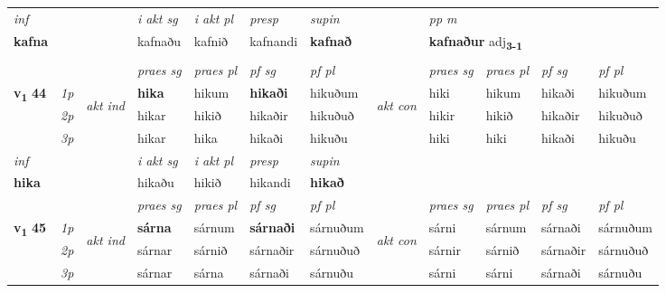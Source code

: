 \begin{longtable}[l]{X>{\footnotesize\itshape}llXXXXlXXXX}
   {\textit{inf}} & &  & \textit{i akt sg} & \textit{i akt pl}   & \textit{presp} & \textit{supin}  && \textit{pp m} \\*
  {\textbf{kafna}} & && kafnaðu  & kafnið   & kafnandi &  \textbf{kafnað}  && \multicolumn{2}{l}{\textbf{kafnaður} adj\textbf{\textsubscript{3-1}}} \\*

\midrule


& \\
\midrule

 & &   & \textit{praes sg}  & \textit{praes pl}    & \textit{ pf sg} & \textit{pf pl} & & \textit{praes sg}  & \textit{praes pl}    & \textit{pf sg} & \textit{pf pl }  \\ \cmidrule{4-7} \cmidrule{9-12}
 \multirow{2}{*}{{{\textbf{v{\textsubscript{1}}} \Large{\textbf{44}}}}}  & 1p & \multirow{3}{*}{\begin{turn}{90}\textit{akt ind}\end{turn}} & \textbf{hika} & hikum & \textbf{hikaði} & hikuðum & \multirow{3}{*}{\begin{turn}{90}\textit{akt con}\end{turn}} &hiki & hikum & hikaði & hikuðum\\*
 & 2p &  &  hikar  & hikið & hikaðir & hikuðuð & & hikir & hikið & hikaðir & hikuðuð \\*
 & 3p &  & hikar & hika & hikaði & hikuðu & & hiki & hiki& hikaði & hikuðu \\*
\cmidrule{4-7} \cmidrule{9-12}

   {\textit{inf}} & &  & \textit{i akt sg} & \textit{i akt pl}   & \textit{presp} & \textit{supin}   \\*
  {\textbf{hika}} & && hikaðu  & hikið   & hikandi &  \textbf{hikað}   \\*

\midrule

 & &   & \textit{praes sg}  & \textit{praes pl}    & \textit{ pf sg} & \textit{pf pl} & & \textit{praes sg}  & \textit{praes pl}    & \textit{pf sg} & \textit{pf pl }  \\ \cmidrule{4-7} \cmidrule{9-12}
 \multirow{2}{*}{{{\textbf{v{\textsubscript{1}}} \Large{\textbf{45}}}}}  & 1p & \multirow{3}{*}{\begin{turn}{90}\textit{akt ind}\end{turn}} & \textbf{sárna} & sárnum & \textbf{sárnaði} & sárnuðum & \multirow{3}{*}{\begin{turn}{90}\textit{akt con}\end{turn}} &sárni & sárnum & sárnaði & sárnuðum\\*
 & 2p &  &  sárnar  & sárnið & sárnaðir & sárnuðuð & & sárnir & sárnið & sárnaðir & sárnuðuð \\*
 & 3p &  & sárnar & sárna & sárnaði & sárnuðu & & sárni & sárni& sárnaði & sárnuðu \\*
\cmidrule{4-7} \cmidrule{9-12}


\end{longtable}
